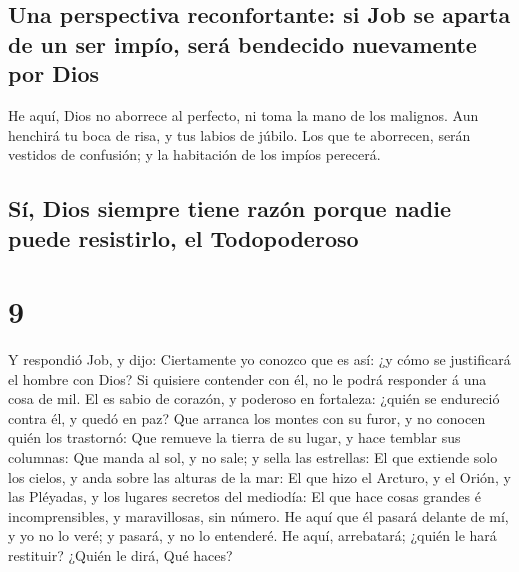 \hypertarget{una-perspectiva-reconfortante-si-job-se-aparta-de-un-ser-impuxedo-seruxe1-bendecido-nuevamente-por-dios}{%
\subsection{Una perspectiva reconfortante: si Job se aparta de un ser
impío, será bendecido nuevamente por
Dios}\label{una-perspectiva-reconfortante-si-job-se-aparta-de-un-ser-impuxedo-seruxe1-bendecido-nuevamente-por-dios}}

 He aquí, Dios no aborrece al perfecto, ni toma la mano
de los malignos.  Aun henchirá tu boca de risa, y tus
labios de júbilo.  Los que te aborrecen, serán vestidos
de confusión; y la habitación de los impíos perecerá.

\hypertarget{suxed-dios-siempre-tiene-razuxf3n-porque-nadie-puede-resistirlo-el-todopoderoso}{%
\subsection{Sí, Dios siempre tiene razón porque nadie puede resistirlo,
el
Todopoderoso}\label{suxed-dios-siempre-tiene-razuxf3n-porque-nadie-puede-resistirlo-el-todopoderoso}}

\hypertarget{section-18-9}{%
\section{9}\label{section-18-9}}

 Y respondió Job, y dijo:  Ciertamente yo
conozco que es así: ¿y cómo se justificará el hombre con Dios?
 Si quisiere contender con él, no le podrá responder á una
cosa de mil.  El es sabio de corazón, y poderoso en
fortaleza: ¿quién se endureció contra él, y quedó en paz? 
Que arranca los montes con su furor, y no conocen quién los trastornó:
 Que remueve la tierra de su lugar, y hace temblar sus
columnas:  Que manda al sol, y no sale; y sella las
estrellas:  El que extiende solo los cielos, y anda sobre
las alturas de la mar:  El que hizo el Arcturo, y el
Orión, y las Pléyadas, y los lugares secretos del mediodía:
 El que hace cosas grandes é incomprensibles, y
maravillosas, sin número.  He aquí que él pasará delante
de mí, y yo no lo veré; y pasará, y no lo entenderé.  He
aquí, arrebatará; ¿quién le hará restituir? ¿Quién le dirá, Qué haces?

